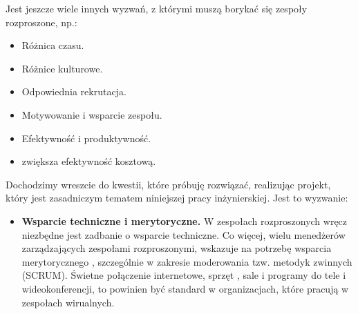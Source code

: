 Jest jeszcze wiele innych wyzwań, z którymi muszą borykać się zespoły rozproszone, np.:

\begin{itemize}
	\item Różnica czasu.
	\item Różnice kulturowe.
	\item Odpowiednia rekrutacja.
	\item Motywowanie i wsparcie zespołu.
	\item Efektywność i produktywność.
	\item zwiększa efektywność kosztową.
\end{itemize}

Dochodzimy wreszcie do kwestii, które próbuję rozwiązać, realizując projekt, który jest zasadniczym tematem niniejszej pracy inżynierskiej. Jest to wyzwanie:

\begin{itemize}
	\item \textbf{Wsparcie techniczne i merytoryczne.}
	W zespołach rozproszonych wręcz niezbędne jest zadbanie o wsparcie techniczne. Co więcej, wielu menedżerów zarządzających zespołami rozproszonymi, wskazuje na potrzebę wsparcia merytorycznego , szczególnie w zakresie moderowania tzw. metodyk zwinnych (SCRUM). Świetne połączenie internetowe, sprzęt , sale i programy do tele i wideokonferencji, to powinien być standard w organizacjach, które pracują w zespołach wirualnych.
\end{itemize}
